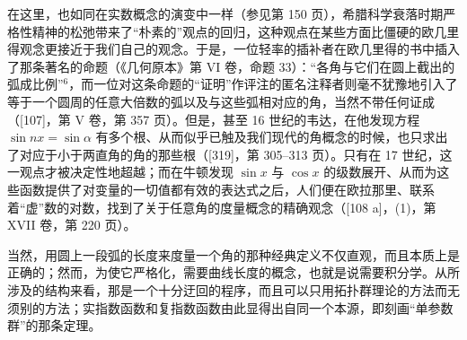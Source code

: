 在这里，也如同在实数概念的演变中一样（参见第 150 页），希腊科学衰落时期严格性精神的松弛带来了“朴素的”观点的回归，这种观点在某些方面比僵硬的欧几里得观念更接近于我们自己的观念。于是，一位轻率的插补者在欧几里得的书中插入了那条著名的命题（《几何原本》第 VI 卷，命题 33）：“各角与它们在圆上截出的弧成比例”\(^{6}\)，而一位对这条命题的“证明”作评注的匿名注释者则毫不犹豫地引入了等于一个圆周的任意大倍数的弧以及与这些弧相对应的角，当然不带任何证成（{[}107{]}，第 V 卷，第 357 页）。但是，甚至 16 世纪的韦达，在他发现方程 \(\sin nx = \sin \alpha\) 有多个根、从而似乎已触及我们现代的角概念的时候，也只求出了对应于小于两直角的角的那些根（{[}319{]}，第 305–313 页）。只有在 17 世纪，这一观点才被决定性地超越；而在牛顿发现 \(\sin x\) 与 \(\cos x\) 的级数展开、从而为这些函数提供了对变量的一切值都有效的表达式之后，人们便在欧拉那里、联系着“虚”数的对数，找到了关于任意角的度量概念的精确观念（{[}108 a{]}，(1)，第 XVII 卷，第 220 页）。

当然，用圆上一段弧的长度来度量一个角的那种经典定义不仅直观，而且本质上是正确的；然而，为使它严格化，需要曲线长度的概念，也就是说需要积分学。从所涉及的结构来看，那是一个十分迂回的程序，而且可以只用拓扑群理论的方法而无须别的方法；实指数函数和复指数函数由此显得出自同一个本源，即刻画“单参数群”的那条定理。

